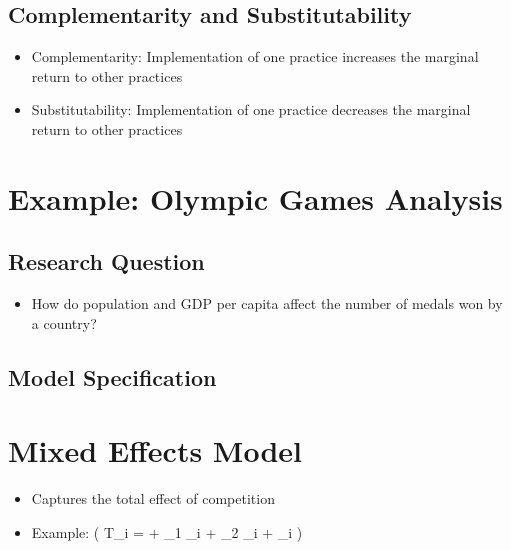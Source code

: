 \documentclass[
]{article}
\providecommand{\tightlist}{%
  \setlength{\itemsep}{0pt}\setlength{\parskip}{0pt}}
\begin{document}
\hypertarget{complementarity-and-substitutability}{%
\subsection{Complementarity and
Substitutability}\label{complementarity-and-substitutability}}

\begin{itemize}
\tightlist
\item
  Complementarity: Implementation of one practice increases the marginal
  return to other practices
\item
  Substitutability: Implementation of one practice decreases the
  marginal return to other practices
\end{itemize}

\hypertarget{example-olympic-games-analysis}{%
\section{Example: Olympic Games
Analysis}\label{example-olympic-games-analysis}}

\hypertarget{research-question}{%
\subsection{Research Question}\label{research-question}}

\begin{itemize}
\tightlist
\item
  How do population and GDP per capita affect the number of medals won
  by a country?
\end{itemize}

\hypertarget{model-specification}{%
\subsection{Model Specification}\label{model-specification}}

\hypertarget{mixed-effects-model}{%
\section{Mixed Effects Model}\label{mixed-effects-model}}

\begin{itemize}
\tightlist
\item
  Captures the total effect of competition
\item
  Example: ( T\_i = \alpha + \beta\_1 \_i + \beta\_2
  \_i + \epsilon\_i )
\end{itemize}
\end{document}
